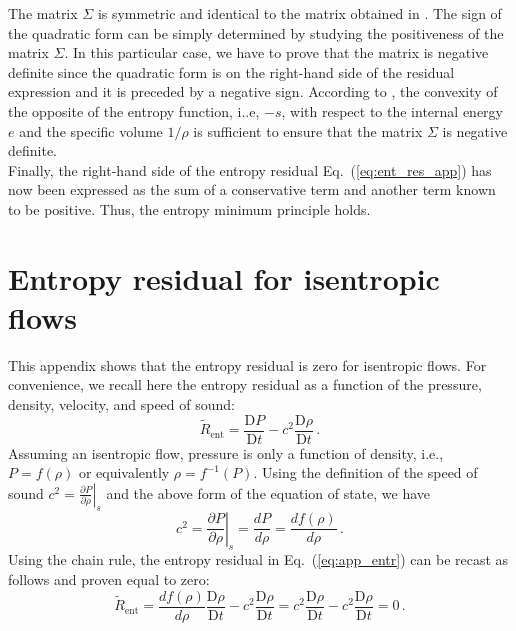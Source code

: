 \documentclass[review,10pt]{elsarticle}
\newcommand{\resinew}{\widetilde{R}_\text{ent}}
\newcommand{\matder}[1]{\frac{\textrm{D} #1}{\textrm{D} t}}
\newcommand{\eqt}[1]{Eq.~(\ref{#1})}                     %
\begin{document}
%
The matrix $\Sigma$ is symmetric and identical to the matrix obtained in \cite{jlg}. The sign of the quadratic form 
can be simply determined by studying the positiveness of the matrix $\Sigma$. In this particular case, we have 
to prove that the matrix is negative definite since the quadratic form is on the right-hand side of the residual expression and it is preceded by a negative 
sign. According to \cite{jlg}, the convexity of the opposite of the entropy function, i..e, $-s$, with respect to the internal energy $e$ 
and the specific volume $1/ \rho$ is sufficient to ensure that the matrix $\Sigma$ is negative definite. \\
Finally, the right-hand side of the entropy residual \eqt{eq:ent_res_app} has now been expressed as the sum of a conservative term and another term known to be positive. Thus, the entropy minimum principle holds.

\newpage
\section{Entropy residual for isentropic flows} \label{app:ise_equ}
This appendix shows that the entropy residual is zero for isentropic flows. For convenience, we recall
here the entropy residual as a function of the pressure, density, velocity, and speed of sound:
%
\begin{equation}\label{eq:app_entr}
\resinew = \matder P - c^2  \matder \rho \,.
\end{equation}
%
Assuming an isentropic flow, pressure is only a function of density, i.e., $P = f( \rho )$ or equivalently $\rho = f^{-1}( P )$. 
Using the definition of the speed of sound $c^2 = \left. \frac{\partial P}{\partial \rho} \right|_s$ and the above 
form of the equation of state, we have
%
\begin{equation}\label{eq:app_sp}
c^2 = \left. \frac{\partial P}{\partial \rho} \right|_s = \frac{d P}{d \rho} = \frac{d f(\rho)}{d \rho} \,.
\end{equation}
%
Using the chain rule, the entropy residual in \eqt{eq:app_entr} can be recast as follows and proven equal to zero:
%
\begin{equation}
\resinew = \frac{d f(\rho)}{d \rho}  \matder \rho - c^2  \matder  \rho  
         = c^2                       \matder \rho - c^2  \matder  \rho  
         =  0 \,.
\end{equation}
%
\end{document}
